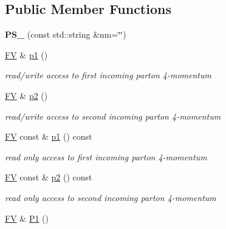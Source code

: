 \subsection*{Public Member Functions}
\begin{DoxyCompactItemize}
\item 
\hypertarget{classPS__2_ae359831d133d3a4830c3600fa8d32c06}{}{\bfseries P\+S\+\_} (const std\+::string \&nm=\char`\"{}\char`\"{})\label{classPS__2_ae359831d133d3a4830c3600fa8d32c06}

\item 
\hypertarget{classPS__2_a8d77fbe890b80085027ac929c85cca18}{}\hyperlink{classFV}{F\+V} \& \hyperlink{classPS__2_a8d77fbe890b80085027ac929c85cca18}{p1} ()\label{classPS__2_a8d77fbe890b80085027ac929c85cca18}

\begin{DoxyCompactList}\small\item\em read/write access to first incoming parton 4-\/momentum \end{DoxyCompactList}\item 
\hypertarget{classPS__2_a51fe8ffc84f4527f5da4530269bc3434}{}\hyperlink{classFV}{F\+V} \& \hyperlink{classPS__2_a51fe8ffc84f4527f5da4530269bc3434}{p2} ()\label{classPS__2_a51fe8ffc84f4527f5da4530269bc3434}

\begin{DoxyCompactList}\small\item\em read/write access to second incoming parton 4-\/momentum \end{DoxyCompactList}\item 
\hypertarget{classPS__2_a999fae525d845b24359f69c99d3f5f67}{}\hyperlink{classFV}{F\+V} const \& \hyperlink{classPS__2_a999fae525d845b24359f69c99d3f5f67}{p1} () const \label{classPS__2_a999fae525d845b24359f69c99d3f5f67}

\begin{DoxyCompactList}\small\item\em read only access to first incoming parton 4-\/momentum \end{DoxyCompactList}\item 
\hypertarget{classPS__2_a144b72cd5af27d3cee36a2d6d88bbb1b}{}\hyperlink{classFV}{F\+V} const \& \hyperlink{classPS__2_a144b72cd5af27d3cee36a2d6d88bbb1b}{p2} () const \label{classPS__2_a144b72cd5af27d3cee36a2d6d88bbb1b}

\begin{DoxyCompactList}\small\item\em read only access to second incoming parton 4-\/momentum \end{DoxyCompactList}\item 
\hypertarget{classPS__2_a44e3773e7808eff87c2db0d1a2244477}{}\hyperlink{classFV}{F\+V} \& \hyperlink{classPS__2_a44e3773e7808eff87c2db0d1a2244477}{P1} ()\label{classPS__2_a44e3773e7808eff87c2db0d1a2244477}


\end{DoxyCompactItemize}
